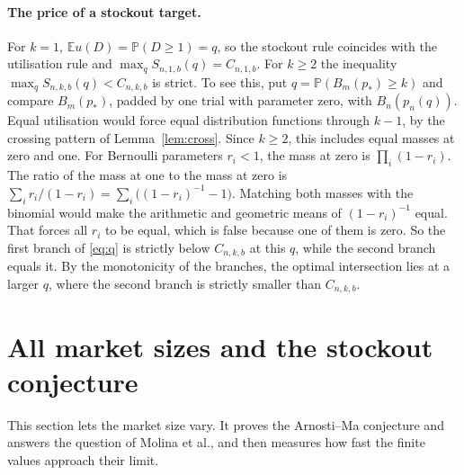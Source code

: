 \documentclass[11pt,a4paper]{article}
\theoremstyle{remark}
\newcommand{\E}{\mathbb E}
\newcommand{\Prob}{\mathbb P}
\begin{document}
\paragraph{The price of a stockout target.}
For $k=1$, $\E u(D)=\Prob(D\ge1)=q$, so the stockout rule coincides with the utilisation rule and $\max_qS_{n,1,b}(q)=C_{n,1,b}$. For $k\ge2$ the inequality $\max_qS_{n,k,b}(q)<C_{n,k,b}$ is strict. To see this, put $q=\Prob(B_m(p_*)\ge k)$ and compare $B_m(p_*)$, padded by one trial with parameter zero, with $B_n(p_n(q))$. Equal utilisation would force equal distribution functions through $k-1$, by the crossing pattern of Lemma~\ref{lem:cross}. Since $k\ge2$, this includes equal masses at zero and one. For Bernoulli parameters $r_i<1$, the mass at zero is $\prod_i(1-r_i)$. The ratio of the mass at one to the mass at zero is $\sum_ir_i/(1-r_i)=\sum_i\big((1-r_i)^{-1}-1\big)$. Matching both masses with the binomial would make the arithmetic and geometric means of $(1-r_i)^{-1}$ equal. That forces all $r_i$ to be equal, which is false because one of them is zero. So the first branch of \eqref{eq:q} is strictly below $C_{n,k,b}$ at this $q$, while the second branch equals it. By the monotonicity of the branches, the optimal intersection lies at a larger $q$, where the second branch is strictly smaller than $C_{n,k,b}$.

\section{All market sizes and the stockout conjecture}\label{sec:all}
This section lets the market size vary. It proves the Arnosti--Ma conjecture and answers the question of Molina et al., and then measures how fast the finite values approach their limit.
\end{document}
